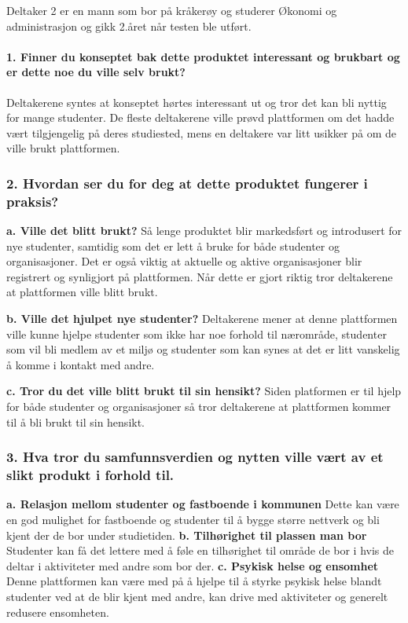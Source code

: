 Deltaker 2 er en mann som bor på kråkerøy og studerer Økonomi og administrasjon og gikk 2.året når testen ble utført. %
\paragraph{1. Finner du konseptet bak dette produktet interessant og brukbart og er dette noe du ville selv brukt?}
Deltakerene syntes at konseptet hørtes interessant ut og tror det kan bli nyttig for mange studenter. De fleste deltakerene ville prøvd plattformen om det hadde vært tilgjengelig på deres studiested, mens en deltakere var litt usikker på om de ville brukt plattformen.

\subsubsection{2. Hvordan ser du for deg at dette produktet fungerer i praksis?}

{\bf a. Ville det blitt brukt?}
Så lenge produktet blir markedsført og introdusert for nye studenter, samtidig som det er lett å bruke for både studenter og organisasjoner. Det er også viktig at aktuelle og aktive organisasjoner blir registrert og synligjort på plattformen. Når dette er gjort riktig tror deltakerene at plattformen ville blitt brukt. 

{\bf b. Ville det hjulpet nye studenter?}
Deltakerene mener at denne plattformen ville kunne hjelpe studenter som ikke har noe forhold til nærområde, studenter som vil bli medlem av et miljø og studenter som kan synes at det er litt vanskelig å komme i kontakt med andre.

{\bf c. Tror du det ville blitt brukt til sin hensikt?}
Siden platformen er til hjelp for både studenter og organisasjoner så tror deltakerene at plattformen kommer til å bli brukt til sin hensikt.

\subsubsection{3. Hva tror du samfunnsverdien og nytten ville vært av et slikt produkt i forhold til.}

{\bf a. Relasjon mellom studenter og fastboende i kommunen}
Dette kan være en god mulighet for fastboende og studenter til å bygge større nettverk og bli kjent der de bor under studietiden.
{\bf b. Tilhørighet til plassen man bor}
Studenter kan få det lettere med å føle en tilhørighet til område de bor i hvis de deltar i aktiviteter med andre som bor der.
{\bf c. Psykisk helse og ensomhet}
Denne plattformen kan være med på å hjelpe til å styrke psykisk helse blandt studenter ved at de blir kjent med andre, kan drive med aktiviteter og generelt redusere ensomheten.
